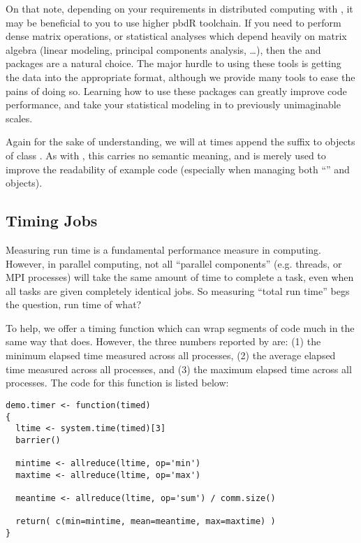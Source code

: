 On that note, depending on your requirements in distributed computing with , it may be beneficial to you to use higher pbdR toolchain.  If you need to perform dense matrix operations, or statistical analyses which depend heavily on matrix algebra (linear modeling, principal components analysis, \dots), then the  and  packages are a natural choice.  The major hurdle to using these tools is getting the data into the appropriate  format, although we provide many tools to ease the pains of doing so.  Learning how to use these packages can greatly improve code performance, and take your statistical modeling in  to previously unimaginable scales.

Again for the sake of understanding, we will at times append the suffix  to objects of class .  As with , this carries no semantic meaning, and is merely used to improve the readability of example code (especially when managing both ``'' and  objects).


\subsection{Timing Jobs}

Measuring run time is a fundamental performance measure in computing.  However, in parallel computing, not all ``parallel components'' (e.g. threads, or MPI processes) will take the same amount of time to complete a task, even when all tasks are given completely identical jobs.  So measuring ``total run time'' begs the question, run time of what?

To help, we offer a timing function  which can wrap segments of code much in the same way that  does.  However, the three numbers reported by  are: (1) the minimum elapsed time measured across all processes, (2) the average elapsed time measured across all processes, and (3) the maximum elapsed time across all processes.  The code for this function is listed below:

\begin{lstlisting}[language=rr,title=Timer Function]
demo.timer <- function(timed)
{
  ltime <- system.time(timed)[3]
  barrier()
  
  mintime <- allreduce(ltime, op='min')
  maxtime <- allreduce(ltime, op='max')
  
  meantime <- allreduce(ltime, op='sum') / comm.size()
  
  return( c(min=mintime, mean=meantime, max=maxtime) )
}
\end{lstlisting}

